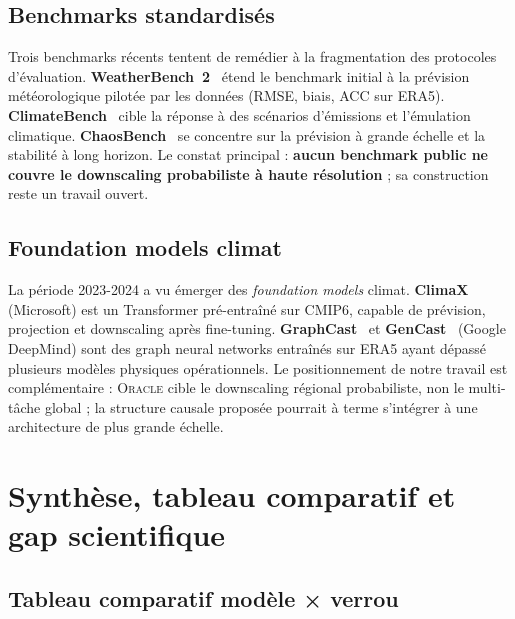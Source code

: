 \documentclass[14pt,a4paper,openany]{extreport}
\theoremstyle{definition}
\newcommand{\Oracle}{\textsc{Oracle}}
\begin{document}
\subsection{Benchmarks standardisés}
\label{ssec:soa-benchmarks-std}

Trois benchmarks récents tentent de remédier à la fragmentation des protocoles d'évaluation. \textbf{WeatherBench~2}~\cite{rasp_weatherbench2_2023} étend le benchmark initial à la prévision météorologique pilotée par les données (RMSE, biais, ACC sur ERA5). \textbf{ClimateBench}~\cite{watson_climatebench_2022} cible la réponse à des scénarios d'émissions et l'émulation climatique. \textbf{ChaosBench}~\cite{nathaniel_chaosbench_2024} se concentre sur la prévision à grande échelle et la stabilité à long horizon. Le constat principal : \textbf{aucun benchmark public ne couvre le downscaling probabiliste à haute résolution} ; sa construction reste un travail ouvert.

\subsection{Foundation models climat}
\label{ssec:soa-foundation}

La période 2023-2024 a vu émerger des \emph{foundation models} climat. \textbf{ClimaX}~\cite{nguyen_climax_2023} (Microsoft) est un Transformer pré-entraîné sur CMIP6, capable de prévision, projection et downscaling après fine-tuning. \textbf{GraphCast}~\cite{lam_graphcast_2023} et \textbf{GenCast}~\cite{price_gencast_2024} (Google DeepMind) sont des graph neural networks entraînés sur ERA5 ayant dépassé plusieurs modèles physiques opérationnels. Le positionnement de notre travail est complémentaire : \Oracle{} cible le downscaling régional probabiliste, non le multi-tâche global ; la structure causale proposée pourrait à terme s'intégrer à une architecture de plus grande échelle.

\section{Synthèse, tableau comparatif et gap scientifique}
\label{sec:soa-synthese}

\subsection{Tableau comparatif modèle × verrou}
\label{ssec:soa-tableau}
\end{document}
